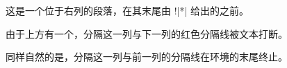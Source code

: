 % 


这是一个位于右列的段落，在其末尾由 \!\switchcolumn!|*| 给出的\mctext{}之前。

由于上方有一个\mctext{}，分隔这一列与下一列的红色分隔线被文本打断。

同样自然的是，分隔这一列与前一列的分隔线在环境的末尾终止。

% 

%